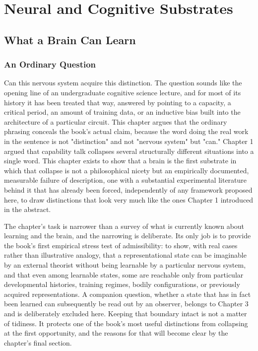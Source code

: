 \documentclass[11pt]{book}
\begin{document}
\part{Neural and Cognitive Substrates}


\chapter{What a Brain Can Learn}

\section{An Ordinary Question}

Can this nervous system acquire this distinction. The question sounds like the opening line of an undergraduate cognitive science lecture, and for most of its history it has been treated that way, answered by pointing to a capacity, a critical period, an amount of training data, or an inductive bias built into the architecture of a particular circuit. This chapter argues that the ordinary phrasing conceals the book's actual claim, because the word doing the real work in the sentence is not "distinction" and not "nervous system" but "can." Chapter 1 argued that capability talk collapses several structurally different situations into a single word. This chapter exists to show that a brain is the first substrate in which that collapse is not a philosophical nicety but an empirically documented, measurable failure of description, one with a substantial experimental literature behind it that has already been forced, independently of any framework proposed here, to draw distinctions that look very much like the ones Chapter 1 introduced in the abstract.

The chapter's task is narrower than a survey of what is currently known about learning and the brain, and the narrowing is deliberate. Its only job is to provide the book's first empirical stress test of admissibility: to show, with real cases rather than illustrative analogy, that a representational state can be imaginable by an external theorist without being learnable by a particular nervous system, and that even among learnable states, some are reachable only from particular developmental histories, training regimes, bodily configurations, or previously acquired representations. A companion question, whether a state that has in fact been learned can subsequently be read out by an observer, belongs to Chapter 3 and is deliberately excluded here. Keeping that boundary intact is not a matter of tidiness. It protects one of the book's most useful distinctions from collapsing at the first opportunity, and the reasons for that will become clear by the chapter's final section.
\end{document}
